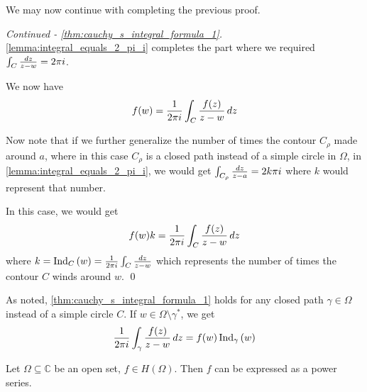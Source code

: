 \documentclass[notoc,notitlepage]{tufte-book}
\begin{document}
We may now continue with completing the previous proof.

\begin{proof}[Continued - \cref{thm:cauchy_s_integral_formula_1}]
	\cref{lemma:integral_equals_2_pi_i} completes the part where we required $\int_{C} \frac{\dif{z}}{z - w} = 2 \pi i$.

	We now have
	\begin{equation*}
		f(w) = \frac{1}{2 \pi i} \int_{C} \frac{f(z)}{z - w} \dif{z}
	\end{equation*}

	Now note that if we further generalize the number of times the contour $C_\rho$ made around $a$, where in this case $C_\rho$ is a closed path instead of a simple circle in $\Omega$, in \cref{lemma:integral_equals_2_pi_i}, we would get $\int_{C_\rho} \frac{\dif{z}}{z - a} = 2k \pi i$ where $k$ would represent that number.

	In this case, we would get
	\begin{equation*}
		f(w) k = \frac{1}{2 \pi i} \int_{C} \frac{f(z)}{z - w} \dif{z}
	\end{equation*}
	where $k = \ind{w}{C} = \frac{1}{2 \pi i} \int_{C} \frac{\dif{z}}{z - w}$ which represents the number of times the contour $C$ winds around $w$. \qed
\end{proof}

\begin{remark}
	As noted, \cref{thm:cauchy_s_integral_formula_1} holds for any closed path $\gamma \in \Omega$ instead of a simple circle $C$. If $w \in \Omega \setminus \gamma^*$, we get
	\begin{equation*}
		\frac{1}{2 \pi i} \int_{\gamma} \frac{f(z)}{z - w} \dif{z} = f(w) \ind{w}{\gamma}
	\end{equation*}
\end{remark}

\begin{propo}\label{propo:holomorphic_functions_can_be_expressed_as_power_series}
	Let $\Omega \subseteq \mathbb{C}$ be an open set, $f \in H(\Omega)$. Then $f$ can be expressed as a power series.
\end{propo}
\end{document}
